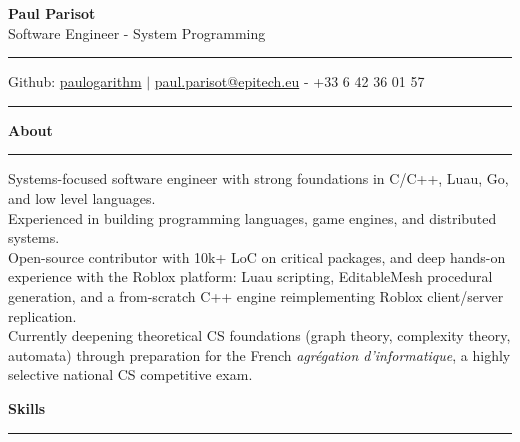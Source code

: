 \documentclass[9pt]{extarticle}
\begin{document}
\begin{center}
	{\huge\bfseries Paul Parisot}
	\\[6pt]
	{\Large Software Engineer - System Programming}
\end{center}


\par\vspace{-12pt}
\rule{\linewidth}{0.4pt}
\par\vspace{-10pt}

\begin{center}
	Github: \href{https://github.com/paulogarithm}{paulogarithm} \quad $\vert$ \quad \href{mailto:paul.parisot@epitech.eu}{paul.parisot@epitech.eu} - +33 6 42 36 01 57
\end{center}

\par\vspace{-15pt}
\rule{\linewidth}{0.4pt}
\par\vspace{1pt}


{\large\bfseries About}
\par\vspace{-8pt}
\rule{\linewidth}{0.4pt}
\par\vspace{1pt}

Systems-focused software engineer with strong foundations in C/C++, Luau, Go, and low level languages.
\\
Experienced in building programming languages, game engines, and distributed systems.
\\
Open-source contributor with 10k+ LoC on critical packages, and deep hands-on experience with the Roblox platform: Luau scripting, EditableMesh procedural generation, and a from-scratch C++ engine reimplementing Roblox client/server replication.
\\
Currently deepening theoretical CS foundations (graph theory, complexity theory, automata) through preparation for the French \textit{agrégation d'informatique}, a highly selective national CS competitive exam.
\par\vspace{1pt}


{\large\bfseries Skills }
\par\vspace{-8pt}
\rule{\linewidth}{0.4pt}
\par\vspace{1pt}
\end{document}
